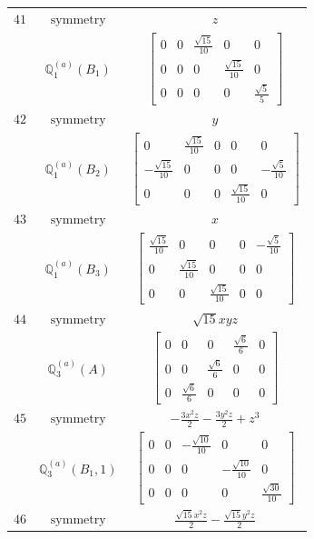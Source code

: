 \documentclass[fleqn,8pt,landscape]{jsarticle}
\begin{document}
\begin{longtable}{ccc}
$ 41 $ & $ \text{symmetry} $ & $ z $ \\
$  $ & $ \mathbb{Q}_{1}^{(a)}(B_{1}) $ & $ \begin{bmatrix} 0 & 0 & \frac{\sqrt{15}}{10} & 0 & 0 \\ 0 & 0 & 0 & \frac{\sqrt{15}}{10} & 0 \\ 0 & 0 & 0 & 0 & \frac{\sqrt{5}}{5} \end{bmatrix} $ \\ \hline
$ 42 $ & $ \text{symmetry} $ & $ y $ \\
$  $ & $ \mathbb{Q}_{1}^{(a)}(B_{2}) $ & $ \begin{bmatrix} 0 & \frac{\sqrt{15}}{10} & 0 & 0 & 0 \\ - \frac{\sqrt{15}}{10} & 0 & 0 & 0 & - \frac{\sqrt{5}}{10} \\ 0 & 0 & 0 & \frac{\sqrt{15}}{10} & 0 \end{bmatrix} $ \\ \hline
$ 43 $ & $ \text{symmetry} $ & $ x $ \\
$  $ & $ \mathbb{Q}_{1}^{(a)}(B_{3}) $ & $ \begin{bmatrix} \frac{\sqrt{15}}{10} & 0 & 0 & 0 & - \frac{\sqrt{5}}{10} \\ 0 & \frac{\sqrt{15}}{10} & 0 & 0 & 0 \\ 0 & 0 & \frac{\sqrt{15}}{10} & 0 & 0 \end{bmatrix} $ \\ \hline
$ 44 $ & $ \text{symmetry} $ & $ \sqrt{15} x y z $ \\
$  $ & $ \mathbb{Q}_{3}^{(a)}(A) $ & $ \begin{bmatrix} 0 & 0 & 0 & \frac{\sqrt{6}}{6} & 0 \\ 0 & 0 & \frac{\sqrt{6}}{6} & 0 & 0 \\ 0 & \frac{\sqrt{6}}{6} & 0 & 0 & 0 \end{bmatrix} $ \\ \hline
$ 45 $ & $ \text{symmetry} $ & $ - \frac{3 x^{2} z}{2} - \frac{3 y^{2} z}{2} + z^{3} $ \\
$  $ & $ \mathbb{Q}_{3}^{(a)}(B_{1},1) $ & $ \begin{bmatrix} 0 & 0 & - \frac{\sqrt{10}}{10} & 0 & 0 \\ 0 & 0 & 0 & - \frac{\sqrt{10}}{10} & 0 \\ 0 & 0 & 0 & 0 & \frac{\sqrt{30}}{10} \end{bmatrix} $ \\ \hline
$ 46 $ & $ \text{symmetry} $ & $ \frac{\sqrt{15} x^{2} z}{2} - \frac{\sqrt{15} y^{2} z}{2} $ \\

\end{longtable}
\end{document}
